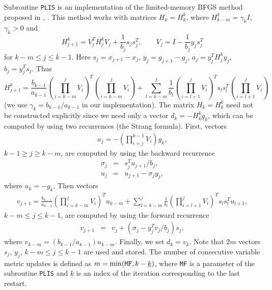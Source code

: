 \documentclass{esub2acm}
\newcommand{\bd}{\begin{displaymath}}
\newcommand{\ed}{\end{displaymath}}
\begin{document}
\noindent Subroutine {\tt PLIS} is an implementation of the
limited-memory BFGS method proposed in \cite{lin1}, \cite{noc1}.
This method works with matrices $H_k = H_k^k$, where
$H_{k-m}^k = \gamma_k I$, $\gamma_k > 0$ and
%
\bd
\label{23}
H_{j+1}^k = V_j^T H_j^k V_j + \frac{1}{b_j} s_j s_j^T, \qquad
V_j = I - \frac{1}{b_j} y_j s_j^T
\ed
%
for $k-m \leq j \leq k-1$. Here $s_j = x_{j+1} - x_j$, $y_j = g_{j+1}- g_j$,
$a_j = y_j^T H_j^k y_j$, $b_j = y_j^T s_j$. Thus
%
\bd
\label{24}
H_{j+1}^k = \frac{b_{k-1}}{a_{k-1}} \left( \prod_{i=k-m}^j V_i \right)^T
\left( \prod_{i=k-m}^j V_i \right) + \sum_{l=k-m}^j
\frac{1}{b_l} \left( \prod_{i=l+1}^j V_i \right)^T s_l s_l^T
\left( \prod_{i=l+1}^j V_i \right)
\ed
%
(we use $\gamma_k = b_{k-1}/a_{k-1}$ in our implementation).
The matrix $H_k = H_k^k$ need not be constructed explicitly
since we need only a vector $d_k = -H_k^k g_k$, which can be computed
by using two recurrences (the Strang formula). First, vectors
%
\begin{eqnarray*}
u_j = -  \left( \prod_{i=j}^{k-1} V_i \right) g_k,
\end{eqnarray*}
%
$k-1 \geq j \geq k-m$, are computed by using the backward
recurrence
%
\begin{eqnarray*}
\sigma_j & = & s_j^Tu_{j+1} / b_j, \\
u_j & = & u_{j+1} - \sigma_j y_j,
\end{eqnarray*}
%
where $u_k = -g_k$. Then vectors
%
\begin{eqnarray*}
v_{j+1} = \frac{b_{k-1}}{a_{k-1}} \left( \prod_{i=k-m}^j V_i \right)^T
u_{k-m} + \sum_{l=k-m}^j \frac{1}{b_l} \left( \prod_{i=l+1}^j
V_i \right)^T s_l s_l^T u_{l+1},
\end{eqnarray*}
%
$k-m \leq j \leq k-1$, are computed by using the forward
recurrence
%
\begin{eqnarray*}
v_{j+1} & = & v_j + (\sigma_j - y_j^T v_j/b_j) s_j,
\end{eqnarray*}
%
where $v_{k-m} = (b_{k-1}/a_{k-1}) u_{k-m}$.
Finally, we set $d_k = v_k$. Note that $2m$ vectors $s_j$, $y_j$,
$k-m \le j \le k-1$ are used and stored. The number of consecutive variable
metric updates is defined as $m = \min({\tt MF}, k-\underline{k})$, where
{\tt MF} is a parameter of the subroutine {\tt PLIS} and $\underline{k}$
is an index of the iteration corresponding to the last restart.

\vspace{5mm}

\end{document}
